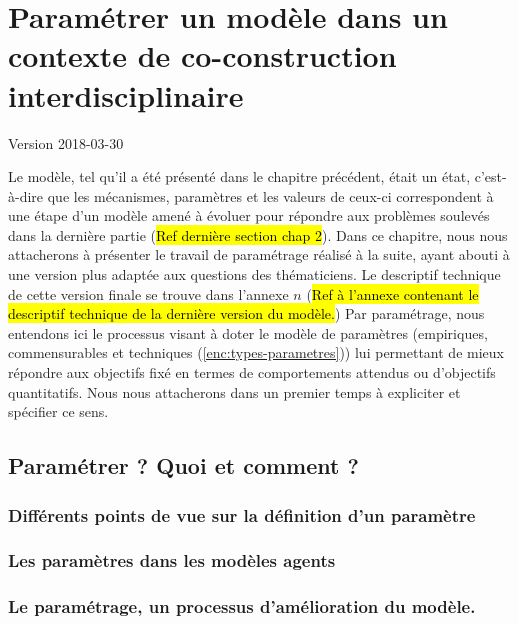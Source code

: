 \documentclass[12pt, a4paper, oneside]{book}
\begin{document}
	\setcounter{part}{0}
	\setcounter{chapter}{2}
	\setcounter{secnumdepth}{3}
		
	\chapter{Paramétrer un modèle dans un contexte de co-construction interdisciplinaire}
	\begin{center}
		{\large Version 2018-03-30}
	\end{center}

	Le modèle, tel qu'il a été présenté dans le chapitre précédent, était un \og état\fg{}, c'est-à-dire que les mécanismes, paramètres et les valeurs de ceux-ci correspondent à une étape d'un modèle amené à évoluer pour répondre aux problèmes soulevés dans la dernière partie (\hl{Ref dernière section chap 2}).
	Dans ce chapitre, nous nous attacherons à présenter le travail de paramétrage réalisé à la suite, ayant abouti à une version plus adaptée aux questions des thématiciens. Le descriptif technique de cette version \og finale\fg{} se trouve dans l'annexe $n$ (\hl{Ref à l'annexe contenant le descriptif technique de la dernière version du modèle.})
	Par paramétrage, nous entendons ici le processus visant à doter le modèle de paramètres (empiriques, \og commensurables\fg{} et techniques (\cref{enc:types-parametres})) lui permettant de mieux répondre aux objectifs fixé en termes de comportements attendus ou d'objectifs quantitatifs. Nous nous attacherons dans un premier temps à expliciter et spécifier ce sens.
	

%	
	\section{Paramétrer ? Quoi et comment ?}
	\subsection{Différents points de vue sur la définition d'un paramètre}
	\subsection{Les paramètres dans les modèles agents}
	\subsection{Le paramétrage, un processus d'amélioration du modèle.}
\end{document}
